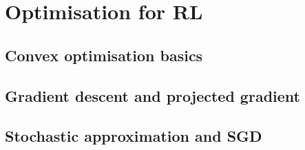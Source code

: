 
\section{Optimisation for RL}

\subsection{Convex optimisation basics}


\subsection{Gradient descent and projected gradient}


\subsection{Stochastic approximation and SGD}

